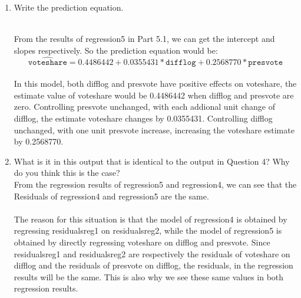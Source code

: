 \documentclass[12pt,letterpaper]{article}
\begin{document}
\begin{enumerate}
		\newpage
		\item Write the prediction equation.	\vspace{.15cm}
		
		\noindent \\From the results of regression5 in Part 5.1, we can get the intercept and slopes respectively. So the prediction equation would be:\\  \[ \hat{\texttt{voteshare}} = 0.4486442 + 0.0355431*\texttt{difflog} + 0.2568770*\texttt{presvote} \]  \\In this model, both difflog and presvote have positive effects on voteshare, the estimate value of voteshare would be 0.4486442 when difflog and presvote are zero. Controlling presvote unchanged, with each addional unit change of difflog, the estimate voteshare changes by 0.0355431. Controlling difflog unchanged, with one unit presvote  increase, increasing the voteshare estimate by 0.2568770.\\
		
		\item What is it in this output that is identical to the output in Question 4? Why do you think this is the case?\\
		
		\noindent From the regression results of regression5 and regression4, we can see that the Residuals of regression4 and regression5 are the same.\\
		\\The reason for this situation is that the model of regression4 is obtained by regressing residuals\textunderscore{}reg1 on residuals\textunderscore{}reg2, while the model of regression5 is obtained by directly regressing voteshare on difflog and presvote. Since residuals\textunderscore{}reg1 and residuals\textunderscore{}reg2 are respectively the residuals of voteshare on difflog and the residuals of presvote on difflog, the residuals,  in the regression results will be the same. This is also why we see these same values in both regression results.
		
	\end{enumerate}
\end{document}
